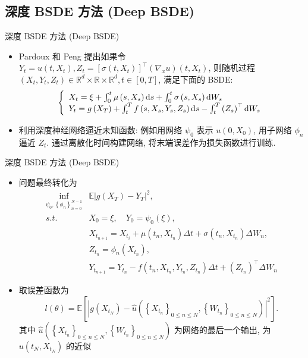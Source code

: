 \documentclass[aspectratio=169]{beamer}
\def\dif{\mathinner{\mathrm{d}}\hphantom{\mskip-\thinmuskip}}
\begin{document}
	\subsection{深度 BSDE 方法 (Deep BSDE)}
	\begin{frame}{深度 BSDE 方法 (Deep BSDE)}
		\begin{itemize}
			\item Pardoux 和 Peng 提出如果令 $Y_{t} = u\left(t, X_{t}\right), Z_{t} = \left[\sigma\left(t, X_{t}\right)\right]^{\top} \left(\nabla_{x} u \right)\left(t, X_{t}\right)$, 则随机过程 $\left(X_{t}, Y_{t}, Z_{t}\right) \in \mathbb{R}^{d} \times \mathbb{R} \times \mathbb{R}^d, t \in \left[0, T\right]$, 满足下面的 BSDE:
				\begin{equation*}
					\left\{\begin{array}{l}
						X_{t} = \xi + \int_{0}^{t} \mu\left(s, X_{s}\right) \dif s + \int_{0}^{t} \sigma\left(s, X_{s}\right) \dif W_{s} \\
						Y_{t} = g\left(X_{T}\right) + \int_{t}^{T} f\left(s, X_{s}, Y_{s}, Z_{s}\right) \dif s - \int_{t}^{T} \left(Z_{s}\right)^{\top} \dif W_{s}
					\end{array}\right.
				\end{equation*}
			\item 利用深度神经网络逼近未知函数: 例如用网络 $\psi_{0}$ 表示 $u(0, X_{0})$, 用子网络 $\phi_{n}$ 逼近 $Z_{t}$. 通过离散化时间构建网络, 将末端误差作为损失函数进行训练.
		\end{itemize}
	\end{frame}

	\begin{frame}{深度 BSDE 方法 (Deep BSDE)}
		\begin{itemize}
			\item 问题最终转化为
				\begin{align}
					\inf_{\psi_{0}, \left\{\phi_{n}\right\}_{n=0}^{N-1}} & \mathbb{E} \left\lvert g\left(X_{T}\right) - Y_{T}\right\rvert^{2}, \\
					s.t.\quad & X_{0} = \xi, \quad Y_{0} = \psi_{0}\left(\xi\right), \\
					& X_{t_{n+1}} = X_{t_{i}} + \mu\left(t_{n},X_{t_{n}}\right) \Delta t + \sigma\left(t_{n},X_{t_{n}}\right) \Delta W_{n}, \\
					& Z_{t_{n}} = \phi_{n}\left(X_{t_{n}}\right), \\
					& Y_{t_{n+1}} = Y_{t_{n}} - f\left(t_{n}, X_{t_{n}}, Y_{t_{n}}, Z_{t_{n}}\right) \Delta t + \left(Z_{t_{n}}\right)^{\top} \Delta W_{n}
				\end{align}
			\item 取误差函数为
				\begin{equation*}
					l\left(\theta\right) = \mathbb{E}\left[\left\lvert g\left(X_{t_{N}}\right) - \hat{u}\left(\left\{X_{t_{n}}\right\}_{0 \leq n \leq N}, \left\{W_{t_{n}}\right\}_{0 \leq n \leq N}\right)\right\rvert^2\right].
				\end{equation*}
				其中 $\hat{u}\left(\left\{X_{t_{n}}\right\}_{0 \leq n \leq N}, \left\{W_{t_{n}}\right\}_{0 \leq n \leq N}\right)$ 为网络的最后一个输出, 为 $u\left(t_{N}, X_{t_{N}}\right)$ 的近似
		\end{itemize}

	\end{frame}
\end{document}
